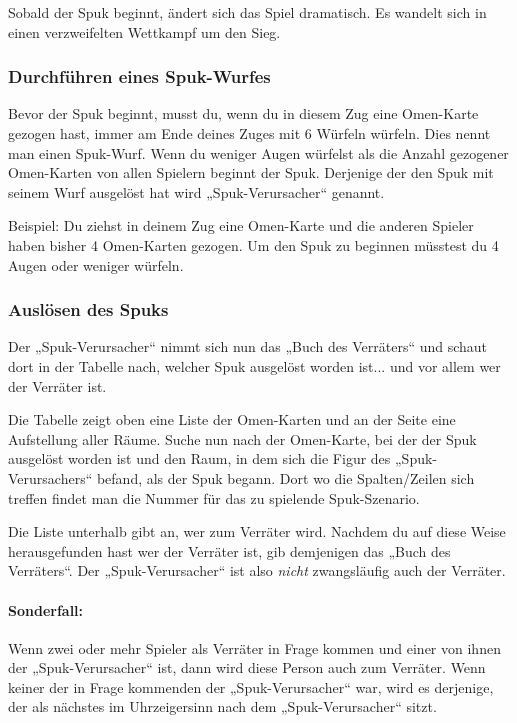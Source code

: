 Sobald der Spuk beginnt, ändert sich das Spiel dramatisch. Es wandelt sich in einen verzweifelten Wettkampf um den Sieg.

\subsubsection{Durchführen eines Spuk-Wurfes}
\label{kap:rule:makehauntroll}

Bevor der Spuk beginnt, musst du, wenn du in diesem Zug eine Omen-Karte gezogen hast, immer am Ende deines Zuges mit 6 Würfeln würfeln. Dies nennt man einen Spuk-Wurf. Wenn du weniger Augen würfelst als die Anzahl gezogener Omen-Karten von allen Spielern beginnt der Spuk. Derjenige der den Spuk mit seinem Wurf ausgelöst hat wird „Spuk-Verursacher“ genannt.

Beispiel: Du ziehst in deinem Zug eine Omen-Karte und die anderen Spieler haben bisher 4 Omen-Karten gezogen. Um den Spuk zu beginnen müsstest du 4 Augen oder weniger würfeln.

\subsubsection{Auslösen des Spuks}

Der „Spuk-Verursacher“ nimmt sich nun das „Buch des Verräters“ und schaut dort in der Tabelle nach, welcher Spuk ausgelöst worden ist... und vor allem wer der Verräter ist.

Die Tabelle zeigt oben eine Liste der Omen-Karten und an der Seite eine Aufstellung aller Räume. Suche nun nach der Omen-Karte, bei der der Spuk ausgelöst worden ist und den Raum, in dem sich die Figur des „Spuk-Verursachers“ befand, als der Spuk begann. Dort wo die Spalten/Zeilen sich treffen findet man die Nummer für das zu spielende Spuk-Szenario.

Die Liste unterhalb gibt an, wer zum Verräter wird. Nachdem du auf diese Weise herausgefunden hast wer der Verräter ist, gib demjenigen das „Buch des Verräters“. Der „Spuk-Verursacher“ ist also \emph{nicht} zwangsläufig auch der Verräter.

\paragraph{Sonderfall:} Wenn zwei oder mehr Spieler als Verräter in Frage kommen und einer von ihnen der „Spuk-Verursacher“ ist, dann wird diese Person auch zum Verräter. Wenn keiner der in Frage kommenden der „Spuk-Verursacher“ war, wird es derjenige, der als nächstes im Uhrzeigersinn nach dem „Spuk-Verursacher“ sitzt.

